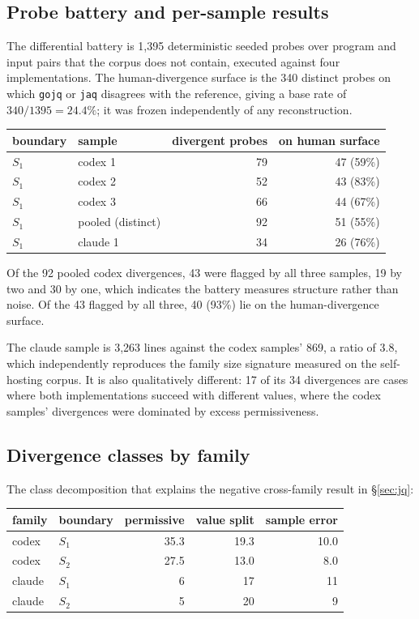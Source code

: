 \subsection{Probe battery and per-sample results}

The differential battery is 1{,}395 deterministic seeded probes over
program and input pairs that the corpus does not contain, executed
against four implementations. The human-divergence surface is the 340
distinct probes on which \texttt{gojq} or \texttt{jaq} disagrees with
the reference, giving a base rate of $340/1395 = 24.4\%$; it was frozen independently of
any reconstruction.

\begin{center}\small
\begin{tabular}{@{}llrr@{}}
\toprule
boundary & sample & divergent probes & on human surface \\
\midrule
$S_1$ & codex 1 & 79 & 47 (59\%) \\
$S_1$ & codex 2 & 52 & 43 (83\%) \\
$S_1$ & codex 3 & 66 & 44 (67\%) \\
$S_1$ & pooled (distinct) & 92 & 51 (55\%) \\
$S_1$ & claude 1 & 34 & 26 (76\%) \\
\bottomrule
\end{tabular}
\end{center}

Of the 92 pooled codex divergences, 43 were flagged by all three samples,
19 by two and 30 by one, which indicates the battery measures structure
rather than noise. Of the 43 flagged by all three, 40 (93\%) lie on the
human-divergence surface.

The claude sample is 3{,}263 lines against the codex samples' 869, a
ratio of 3.8, which independently reproduces the family size signature
measured on the self-hosting corpus. It is also qualitatively different:
17 of its 34 divergences are cases where both implementations succeed
with different values, where the codex samples' divergences were
dominated by excess permissiveness.

\subsection{Divergence classes by family}

The class decomposition that explains the negative cross-family result in
\S\ref{sec:jq}:

\begin{center}\small
\begin{tabular}{@{}llrrr@{}}
\toprule
family & boundary & permissive & value split & sample error \\
\midrule
codex  & $S_1$ & 35.3 & 19.3 & 10.0 \\
codex  & $S_2$ & 27.5 & 13.0 &  8.0 \\
claude & $S_1$ &  6   & 17   & 11   \\
claude & $S_2$ &  5   & 20   &  9   \\
\bottomrule
\end{tabular}
\end{center}

